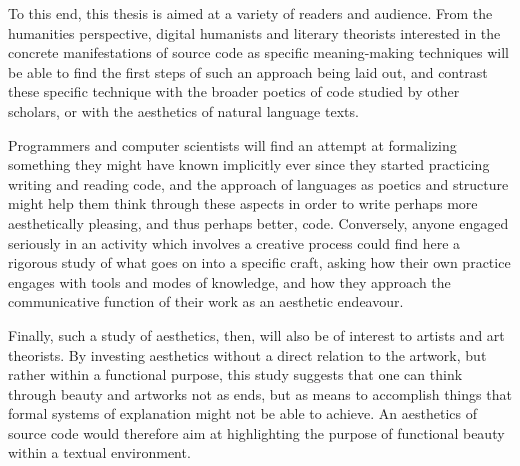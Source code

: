 To this end, this thesis is aimed at a variety of readers and audience. From the humanities perspective, digital humanists and literary theorists interested in the concrete manifestations of source code as specific meaning-making techniques will be able to find the first steps of such an approach being laid out, and contrast these specific technique with the broader poetics of code studied by other scholars, or with the aesthetics of natural language texts.

Programmers and computer scientists will find an attempt at formalizing something they might have known implicitly ever since they started practicing writing and reading code, and the approach of languages as poetics and structure might help them think through these aspects in order to write perhaps more aesthetically pleasing, and thus perhaps better, code. Conversely, anyone engaged seriously in an activity which involves a creative process could find here a rigorous study of what goes on into a specific craft, asking how their own practice engages with tools and modes of knowledge, and how they approach the communicative function of their work as an aesthetic endeavour.

Finally, such a study of aesthetics, then, will also be of interest to artists and art theorists. By investing aesthetics without a direct relation to the artwork, but rather within a functional purpose, this study suggests that one can think through beauty and artworks not as ends, but as means to accomplish things that formal systems of explanation might not be able to achieve. An aesthetics of source code would therefore aim at highlighting the purpose of functional beauty within a textual environment.